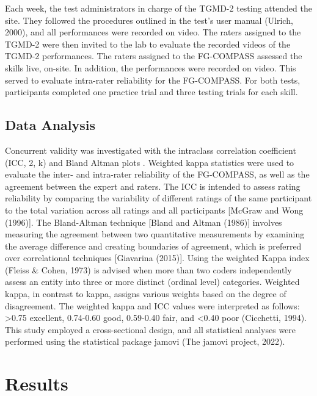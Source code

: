 \documentclass[
  man,
  colorlinks=true,linkcolor=blue,citecolor=blue,urlcolor=blue]{apa7}
\begin{document}
Each week, the test administrators in charge of the TGMD-2 testing
attended the site. They followed the procedures outlined in the test's
user manual (Ulrich, 2000), and all performances were recorded on video.
The raters assigned to the TGMD-2 were then invited to the lab to
evaluate the recorded videos of the TGMD-2 performances. The raters
assigned to the FG-COMPASS assessed the skills live, on-site. In
addition, the performances were recorded on video. This served to
evaluate intra-rater reliability for the FG-COMPASS. For both tests,
participants completed one practice trial and three testing trials for
each skill.

\hypertarget{data-analysis}{%
\subsection{Data Analysis}\label{data-analysis}}

Concurrent validity was investigated with the intraclass correlation
coefficient (ICC, 2, k) and Bland Altman plots . Weighted kappa
statistics were used to evaluate the inter- and intra-rater reliability
of the FG-COMPASS, as well as the agreement between the expert and
raters. The ICC is intended to assess rating reliability by comparing
the variability of different ratings of the same participant to the
total variation across all ratings and all participants {[}McGraw and
Wong (1996){]}. The Bland-Altman technique {[}Bland and Altman (1986){]}
involves measuring the agreement between two quantitative measurements
by examining the average difference and creating boundaries of
agreement, which is preferred over correlational techniques {[}Giavarina
(2015){]}. Using the weighted Kappa index (Fleiss \& Cohen, 1973) is
advised when more than two coders independently assess an entity into
three or more distinct (ordinal level) categories. Weighted kappa, in
contrast to kappa, assigns various weights based on the degree of
disagreement. The weighted kappa and ICC values were interpreted as
follows: \textgreater0.75 excellent, 0.74-0.60 good, 0.59-0.40 fair, and
\textless0.40 poor (Cicchetti, 1994). This study employed a
cross-sectional design, and all statistical analyses were performed
using the statistical package jamovi (The jamovi project, 2022).

\hypertarget{results}{%
\section{Results}\label{results}}
\end{document}

